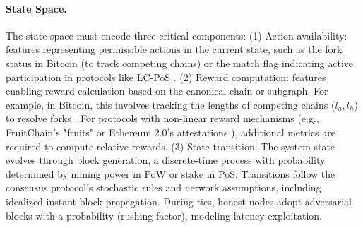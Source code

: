 \paragraph{State Space.}
The state space must encode three critical components: (1) Action availability: features representing permissible actions in the current state, such as the fork status in Bitcoin (to track competing chains) \cite{sapirshtein2016optimal} or the match flag indicating active participation in protocols like LC-PoS \cite{sarenche2024deep}.
(2) Reward computation: features enabling reward calculation based on the canonical chain or subgraph. For example, in Bitcoin, this involves tracking the lengths of competing chains ($l_a, l_h$) to resolve forks \cite{nakamoto2008bitcoin}. For protocols with non-linear reward mechanisms (e.g., FruitChain’s "fruits" \cite{pass2017fruitchains,zhang2019lay} or Ethereum 2.0’s attestations \cite{zhang2024max}), additional metrics are required to compute relative rewards.
(3) State transition: The system state evolves through block generation, a discrete-time process with probability determined by mining power in PoW or stake in PoS. Transitions follow the consensus protocol’s stochastic rules and network assumptions, including idealized instant block propagation. During ties, honest nodes adopt adversarial blocks with a probability (rushing factor), modeling latency exploitation.



